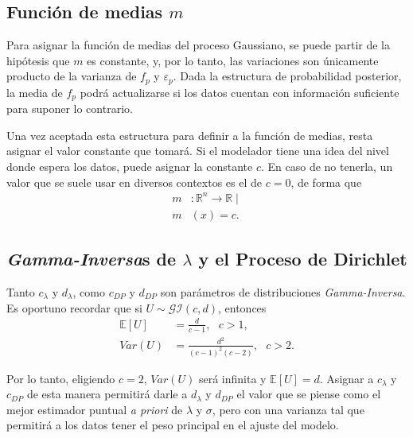 \subsection{Funci\'on de medias $m$}

Para asignar la funci\'on de medias del proceso Gaussiano, se puede partir de la hip\'otesis que $m$ es constante, y, por lo tanto, las variaciones son \'unicamente producto de la varianza de $f_p$ y $\varepsilon_p$. Dada la estructura de probabilidad posterior, la media de $f_p$ podr\'a actualizarse si los datos cuentan con informaci\'on suficiente para suponer lo contrario. 

Una vez aceptada esta estructura para definir a la funci\'on de medias, resta asignar el valor constante que tomar\'a. Si el modelador tiene una idea del nivel donde espera los datos, puede asignar la constante $c$. En caso de no tenerla, un valor que se suele usar en diversos contextos es el de $c=0$, de forma que
\begin{equation*}
\begin{aligned}
    m&:\mathbb{R}^n \rightarrow \mathbb{R} \mid \\
    m&(x) = c.
\end{aligned}
\end{equation*}

\subsection{\textit{Gamma-Inversa}s de $\lambda$ y el Proceso de Dirichlet}

Tanto $c_\lambda$ y $d_\lambda$, como $c_{DP}$ y $d_{DP}$ son par\'ametros de distribuciones \textit{Gamma-Inversa}. Es oportuno recordar que si $U \sim \mathcal{GI}(c,d)$, entonces
\begin{equation*}
\begin{aligned}
    \mathbb{E}[U] &= \frac{d}{c-1}, \text{ } c>1,\\
    Var(U) &= \frac{d^2}{(c-1)^2(c-2)}, \text{ } c>2.
\end{aligned}
\end{equation*}

Por lo tanto, eligiendo $c = 2$, $Var(U)$ ser\'a infinita y $\mathbb{E}[U] = d$. Asignar a $c_\lambda$ y $c_{DP}$ de esta manera permitir\'a darle a $d_\lambda$ y $d_{DP}$ el valor que se piense como el mejor estimador puntual \textit{a priori} de $\lambda$ y $\sigma$, pero con una varianza tal que permitir\'a a los datos tener el peso principal en el ajuste del modelo. 

